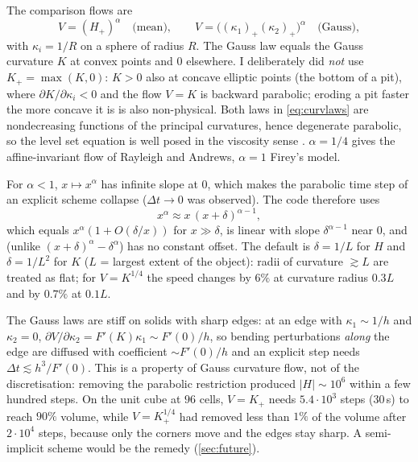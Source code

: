 \documentclass[11pt]{article}
\begin{document}
The comparison flows are
\begin{equation}\label{eq:curvlaws}
V=(H_+)^\alpha\quad\text{(mean)},\qquad V=\big((\kappa_1)_+(\kappa_2)_+\big)^\alpha\quad\text{(Gauss)},
\end{equation}
with $\kappa_i=1/R$ on a sphere of radius $R$. The Gauss law equals the Gauss curvature $K$ at convex
points and $0$ elsewhere. I deliberately did \emph{not} use $K_+=\max(K,0)$: $K>0$ also at concave
elliptic points (the bottom of a pit), where $\partial K/\partial\kappa_i<0$ and the flow $V=K$ is backward
parabolic; eroding a pit faster the more concave it is is also non-physical. Both laws in
\eqref{eq:curvlaws} are nondecreasing functions of the principal curvatures, hence degenerate parabolic,
so the level set equation is well posed in the viscosity sense \cite{evansspruck}. $\alpha=1/4$ gives the
affine-invariant flow of Rayleigh and Andrews, $\alpha=1$ Firey's model.

For $\alpha<1$, $x\mapsto x^\alpha$ has infinite slope at $0$, which makes the parabolic time step of an
explicit scheme collapse ($\Delta t\to0$ was observed). The code therefore uses
\begin{equation}
x^\alpha \approx x\,(x+\delta)^{\alpha-1},
\end{equation}
which equals $x^\alpha(1+O(\delta/x))$ for $x\gg\delta$, is linear with slope $\delta^{\alpha-1}$ near $0$,
and (unlike $(x+\delta)^\alpha-\delta^\alpha$) has no constant offset. The default is $\delta=1/L$ for $H$
and $\delta=1/L^2$ for $K$ ($L$ = largest extent of the object): radii of curvature $\gtrsim L$ are treated
as flat; for $V=K^{1/4}$ the speed changes by $6\%$ at curvature radius $0.3L$ and by $0.7\%$ at
$0.1L$.

The Gauss laws are stiff on solids with sharp edges: at an edge with $\kappa_1\sim1/h$ and $\kappa_2=0$,
$\partial V/\partial\kappa_2=F'(K)\kappa_1\sim F'(0)/h$, so bending perturbations \emph{along} the edge are
diffused with coefficient $\sim F'(0)/h$ and an explicit step needs $\Delta t\lesssim h^3/F'(0)$. This is a
property of Gauss curvature flow, not of the discretisation: removing the parabolic restriction produced
$|H|\sim10^6$ within a few hundred steps. On the unit cube at $96$ cells, $V=K_+$ needs $5.4\cdot10^3$
steps ($30$\,s) to reach $90\%$ volume, while $V=K_+^{1/4}$ had removed less than $1\%$ of the volume
after $2\cdot10^4$ steps, because only the corners move and the edges stay sharp. A semi-implicit scheme would be the remedy
(\cref{sec:future}).
\end{document}
